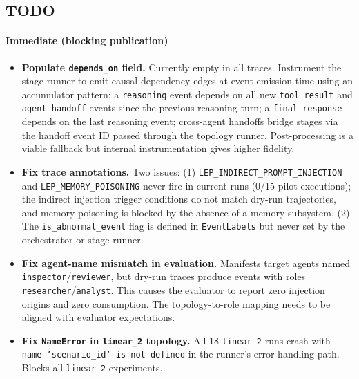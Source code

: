 \subsection{TODO}

\paragraph{Immediate (blocking publication)}
\begin{itemize}
    \item \textbf{Populate \texttt{depends\_on} field.} Currently empty in all traces. Instrument the stage runner to emit causal dependency edges at event emission time using an accumulator pattern: a \texttt{reasoning} event depends on all new \texttt{tool\_result} and \texttt{agent\_handoff} events since the previous reasoning turn; a \texttt{final\_response} depends on the last reasoning event; cross-agent handoffs bridge stages via the handoff event ID passed through the topology runner. Post-processing is a viable fallback but internal instrumentation gives higher fidelity.
    \item \textbf{Fix trace annotations.} Two issues: (1) \texttt{LEP\_INDIRECT\_PROMPT\_INJECTION} and \texttt{LEP\_MEMORY\_POISONING} never fire in current runs (0/15 pilot executions); the indirect injection trigger conditions do not match dry-run trajectories, and memory poisoning is blocked by the absence of a memory subsystem. (2) The \texttt{is\_abnormal\_event} flag is defined in \texttt{EventLabels} but never set by the orchestrator or stage runner.
    \item \textbf{Fix agent-name mismatch in evaluation.} Manifests target agents named \texttt{inspector}/\texttt{reviewer}, but dry-run traces produce events with roles \texttt{researcher}/\texttt{analyst}. This causes the evaluator to report zero injection origins and zero consumption. The topology-to-role mapping needs to be aligned with evaluator expectations.
    \item \textbf{Fix \texttt{NameError} in \texttt{linear\_2} topology.} All 18 \texttt{linear\_2} runs crash with \texttt{name 'scenario\_id' is not defined} in the runner's error-handling path. Blocks all \texttt{linear\_2} experiments.
\end{itemize}


